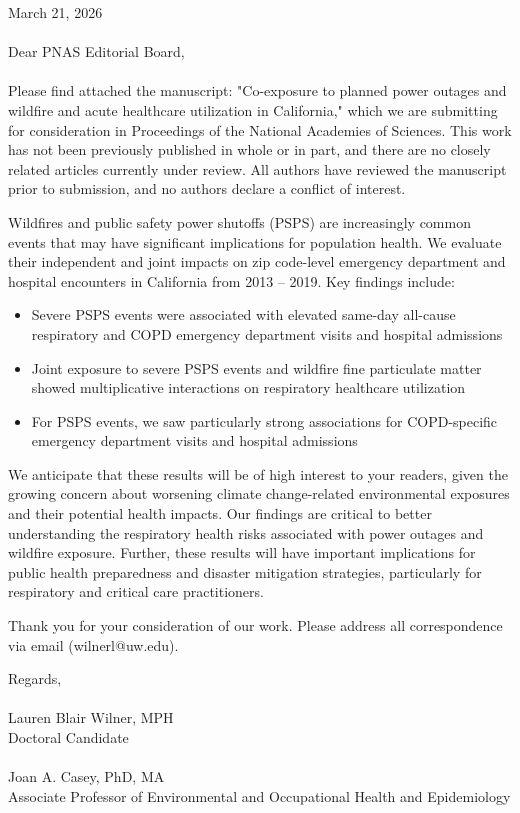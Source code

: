 \documentclass[../main.tex]{subfiles}
\begin{document}
March 21, 2026
\\
\\
Dear PNAS Editorial Board,
\\
\\
Please find attached the manuscript: "Co-exposure to planned power outages and wildfire \PM and acute healthcare utilization in California," which we are submitting for consideration in Proceedings of the National Academies of Sciences. This work has not been previously published in whole or in part, and there are no closely related articles currently under review. All authors have reviewed the manuscript prior to submission, and no authors declare a conflict of interest.

Wildfires and public safety power shutoffs (PSPS) are increasingly common events that may have significant implications for population health. We evaluate their independent and joint impacts on zip code-level emergency department and hospital encounters in California from 2013 -- 2019. Key findings include:

\begin{itemize}
\item Severe PSPS events were associated with elevated same-day all-cause respiratory and COPD emergency department visits and hospital admissions
\item Joint exposure to severe PSPS events and wildfire fine particulate matter showed multiplicative interactions on respiratory healthcare utilization
\item For PSPS events, we saw particularly strong associations for COPD-specific emergency department visits and hospital admissions
\end{itemize}

We anticipate that these results will be of high interest to your readers, given the growing concern about worsening climate change-related environmental exposures and their potential health impacts. Our findings are critical to better understanding the respiratory health risks associated with power outages and wildfire \PM exposure. Further, these results will have important implications for public health preparedness and disaster mitigation strategies, particularly for respiratory and critical care practitioners.

Thank you for your consideration of our work. Please address all correspondence via email (wilnerl@uw.edu).

Regards,
\\
\\
Lauren Blair Wilner, MPH \\
Doctoral Candidate 
\\
\\
Joan A. Casey, PhD, MA\\
Associate Professor of Environmental and Occupational Health and Epidemiology
\end{document}
